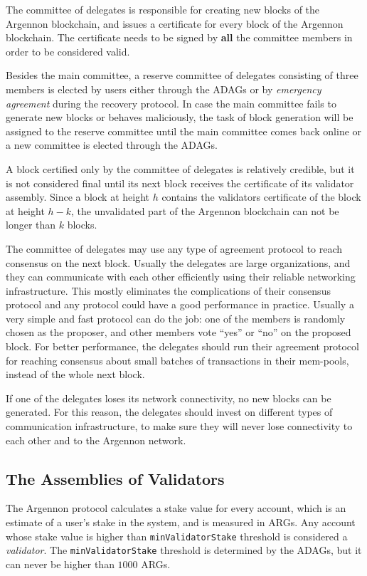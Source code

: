 The committee of delegates is responsible for creating new blocks of the Argennon blockchain, and issues a
certificate for every block of the Argennon blockchain. The certificate needs to be signed
by \textbf{all} the committee members in order to be considered valid.

Besides the main committee, a reserve committee of delegates consisting of three members is elected by users
either through the ADAGs or by \emph{emergency agreement} during the recovery protocol. In case the main committee
fails to generate new blocks or behaves maliciously, the task of
block generation will be assigned to the reserve committee until the main committee comes back online or a new
committee is elected through the ADAGs.

A block certified only by the committee of delegates is relatively credible, but it is not considered final
until its next block receives the certificate of its validator assembly. Since a block at height $h$ contains the
validators certificate of the block at height $h-k$, the unvalidated part of the Argennon blockchain can not be longer
than $k$ blocks.

The committee of delegates may use any type of agreement protocol to reach consensus on the
next block. Usually the delegates are large organizations, and they can communicate with each
other efficiently using their reliable networking infrastructure. This mostly eliminates the complications of their
consensus protocol and any protocol could have a good performance in practice. Usually a very simple and fast protocol
can do the job: one of the members is randomly chosen as the proposer, and other members vote ``yes'' or ``no'' on the
proposed block. For better performance, the delegates should run their agreement protocol for reaching consensus about
small batches of transactions in their mem-pools, instead of the whole next block.

If one of the delegates loses its network connectivity, no new blocks can be generated. For this reason,
the delegates should invest on different types of communication infrastructure, to make sure they will never lose
connectivity to each other and to the Argennon network.

\subsection{The Assemblies of Validators}\label{subsec:validators-committee}

The Argennon protocol calculates a stake value for every account, which is an estimate of a user's stake in the
system, and is measured in ARGs. Any account whose stake value is higher than
\texttt{minValidatorStake} threshold is considered a \emph{validator}.
The \texttt{minValidatorStake}
threshold is determined by the ADAGs, but it can never be higher than $1000$ ARGs.

